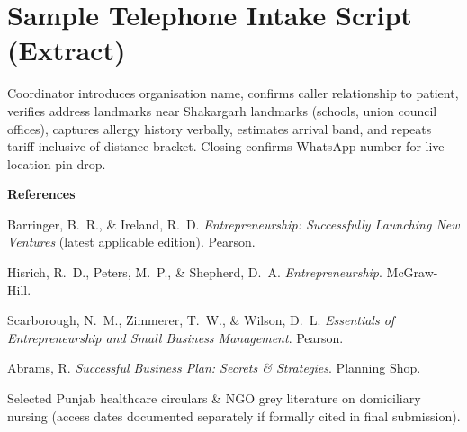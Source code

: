 \documentclass[12pt,a4paper]{report}
\begin{document}
\chapter{Sample Telephone Intake Script (Extract)}

Coordinator introduces organisation name, confirms caller relationship to patient, verifies address landmarks near Shakargarh landmarks (schools, union council offices), captures allergy history verbally, estimates arrival band, and repeats tariff inclusive of distance bracket. Closing confirms WhatsApp number for live location pin drop.

\vspace{1cm}
\begin{center}
\textbf{References}\\[0.5cm]
\begin{minipage}{0.9\textwidth}
\small
Barringer, B.\ R., \& Ireland, R.\ D. \textit{Entrepreneurship: Successfully Launching New Ventures} (latest applicable edition). Pearson.

Hisrich, R.\ D., Peters, M.\ P., \& Shepherd, D.\ A. \textit{Entrepreneurship}. McGraw-Hill.

Scarborough, N.\ M., Zimmerer, T.\ W., \& Wilson, D.\ L. \textit{Essentials of Entrepreneurship and Small Business Management}. Pearson.

Abrams, R. \textit{Successful Business Plan: Secrets \& Strategies}. Planning Shop.

Selected Punjab healthcare circulars \& NGO grey literature on domiciliary nursing (access dates documented separately if formally cited in final submission).
\end{minipage}
\end{center}
\end{document}
